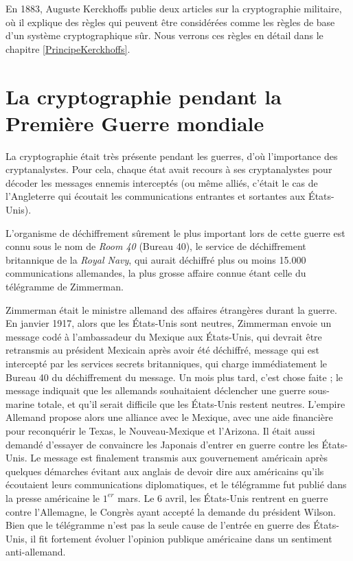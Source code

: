En 1883, Auguste Kerckhoffs publie deux articles sur la
cryptographie militaire, où il explique des règles qui peuvent être
considérées comme les règles de base d'un système cryptographique
sûr. Nous verrons ces règles en détail dans le chapitre
\ref{PrincipeKerckhoffs}. \\

\section{La cryptographie pendant la Première Guerre mondiale}
La cryptographie était très présente pendant les guerres, d'où
l'importance des cryptanalystes. Pour cela, chaque état avait recours
à ses cryptanalystes pour décoder les messages ennemis interceptés (ou
même alliés, c'était le cas de l'Angleterre qui écoutait les
communications entrantes et sortantes aux États-Unis).

L'organisme de déchiffrement sûrement le plus important lors de cette guerre
est connu sous le nom de \emph{Room 40} (Bureau 40), le service de
déchiffrement britannique de la \emph{Royal Navy}, qui aurait déchiffré
plus ou moins 15.000 communications allemandes, la plus grosse affaire
connue étant celle du télégramme de Zimmerman.

Zimmerman était le ministre allemand des affaires étrangères durant la
guerre. En janvier 1917, alors que les États-Unis sont neutres,
Zimmerman envoie un message codé à l'ambassadeur du Mexique aux
États-Unis, qui devrait être retransmis au président Mexicain après
avoir été déchiffré, message qui est intercepté par les services
secrets britanniques, qui charge immédiatement le Bureau 40 du
déchiffrement du message. Un mois plus tard, c'est chose faite ; le
message indiquait que les allemands souhaitaient déclencher une guerre
sous-marine totale, et qu'il serait difficile que les États-Unis
restent neutres. L'empire Allemand propose alors une alliance avec le
Mexique, avec une aide financière pour reconquérir le Texas, le
Nouveau-Mexique et l'Arizona. Il était aussi demandé d'essayer de
convaincre les Japonais d'entrer en guerre contre les États-Unis.
Le message est finalement transmis aux gouvernement américain après
quelques démarches évitant aux anglais de devoir dire aux américains
qu'ils écoutaient leurs communications diplomatiques, et le télégramme
fut publié dans la presse américaine le $1^{er}$ mars. Le 6 avril, les
États-Unis rentrent en guerre contre l'Allemagne, le Congrès ayant
accepté la demande du président Wilson. Bien que le télégramme n'est
pas la seule cause de l'entrée en guerre des États-Unis, il fit
fortement évoluer l'opinion publique américaine dans un sentiment
anti-allemand.

